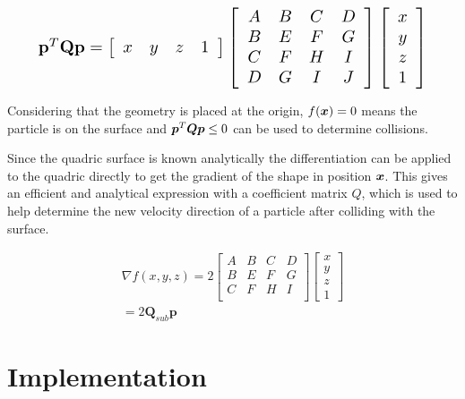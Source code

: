 \begin{eqnarray} \label{eqn:quadricmatrixform}
\resizebox{0.9\linewidth}{!}{$
\mathbf{p}^T\mathbf{Q}\mathbf{p} =  \left[ \begin{array}{cccc} x & y & z & 1 \end{array} \right] \left[ \begin{array}{cccc}
A & B & C &D\\
B & E & F & G\\
C & F & H & I\\
D & G & I & J\\
 \end{array} \right] \left[ \begin{array}{c}x \\
y \\
z \\
1 \end{array} \right]
$}
\end{eqnarray}

Considering that the geometry is placed at the origin, $f(\bm{x}) = 0$ means the particle is on the surface and $\bm{p}^T\bm{Q}\bm{p} \leq 0$ can be used to determine collisions.

Since the quadric surface is known analytically the differentiation can be applied to the quadric directly to get the gradient of the shape in position $\bm{x}$.
This gives an efficient and analytical expression with a coefficient matrix $Q$, which is used to help determine the new velocity direction of a particle after colliding with the surface.

\begin{eqnarray} \label{eq:quadricnormal}
\nabla f(x,y,z) = 2 \left[ \begin{array}{cccc}
A & B & C &D\\
B & E & F & G\\
C & F & H & I\\
 \end{array} \right] \left[ \begin{array}{c}x \\
y \\
z \\
1 \end{array} \right]\\
\nonumber = 2\mathbf{Q}_{sub}\mathbf{p}
\end{eqnarray} 

\section{Implementation}

